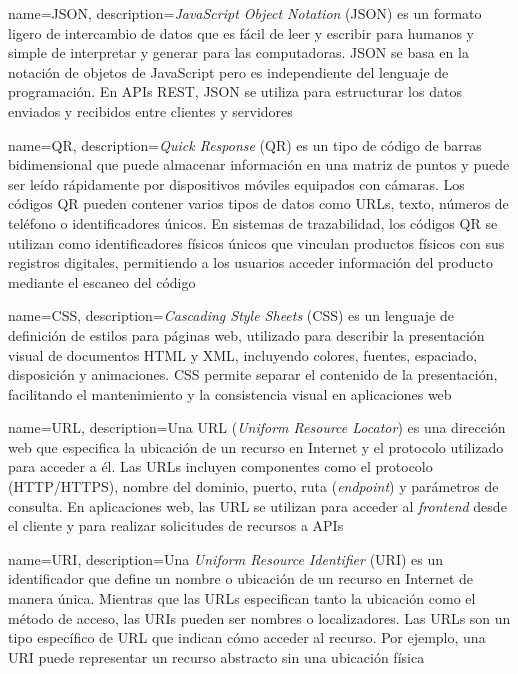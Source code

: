 {
    name=JSON,
    description={\textit{JavaScript Object Notation} (JSON) es un formato ligero de intercambio de datos que es fácil de leer y escribir para humanos y simple de interpretar y generar para las computadoras. JSON se basa en la notación de objetos de JavaScript pero es independiente del lenguaje de programación. En APIs REST, JSON se utiliza para estructurar los datos enviados y recibidos entre clientes y servidores}
}

{
    name=QR,
    description={\textit{Quick Response} (QR) es un tipo de código de barras bidimensional que puede almacenar información en una matriz de puntos y puede ser leído rápidamente por dispositivos móviles equipados con cámaras. Los códigos QR pueden contener varios tipos de datos como URLs, texto, números de teléfono o identificadores únicos. En sistemas de trazabilidad, los códigos QR se utilizan como identificadores físicos únicos que vinculan productos físicos con sus registros digitales, permitiendo a los usuarios acceder información del producto mediante el escaneo del código}
}

{
    name=CSS,
    description={\textit{Cascading Style Sheets} (CSS) es un lenguaje de definición de estilos para páginas web, utilizado para describir la presentación visual de documentos HTML y XML, incluyendo colores, fuentes, espaciado, disposición y animaciones. CSS permite separar el contenido de la presentación, facilitando el mantenimiento y la consistencia visual en aplicaciones web}
}

{
    name=URL,
    description={Una URL (\textit{Uniform Resource Locator}) es una dirección web que especifica la ubicación de un recurso en Internet y el protocolo utilizado para acceder a él. Las URLs incluyen componentes como el protocolo (HTTP/HTTPS), nombre del dominio, puerto, ruta (\textit{endpoint}) y parámetros de consulta. En aplicaciones web, las URL se utilizan para acceder al \textit{frontend} desde el cliente y para realizar solicitudes de recursos a APIs}
}

{
    name=URI,
    description={Una \textit{Uniform Resource Identifier} (URI) es un identificador que define un nombre o ubicación de un recurso en Internet de manera única. Mientras que las URLs especifican tanto la ubicación como el método de acceso, las URIs pueden ser nombres o localizadores. Las URLs son un tipo específico de URL que indican cómo acceder al recurso. Por ejemplo, una URI puede representar un recurso abstracto sin una ubicación física}
}

